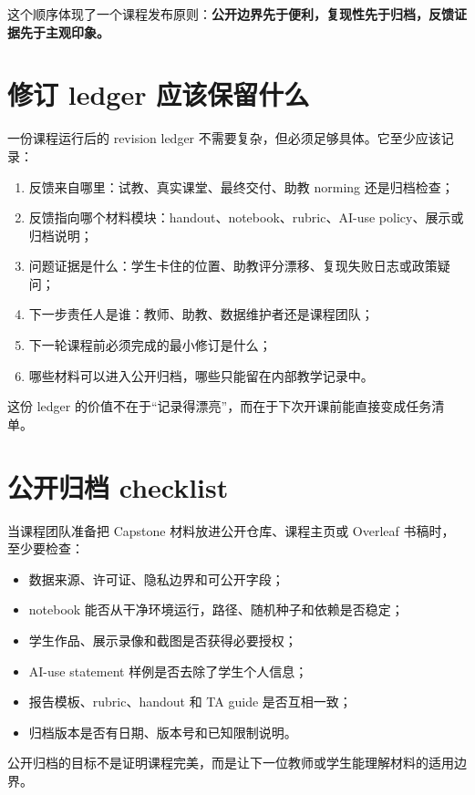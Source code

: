 这个顺序体现了一个课程发布原则：\textbf{公开边界先于便利，复现性先于归档，反馈证据先于主观印象。}

\section{修订 ledger 应该保留什么}

一份课程运行后的 revision ledger 不需要复杂，但必须足够具体。它至少应该记录：

\begin{enumerate}
    \item 反馈来自哪里：试教、真实课堂、最终交付、助教 norming 还是归档检查；
    \item 反馈指向哪个材料模块：handout、notebook、rubric、AI-use policy、展示或归档说明；
    \item 问题证据是什么：学生卡住的位置、助教评分漂移、复现失败日志或政策疑问；
    \item 下一步责任人是谁：教师、助教、数据维护者还是课程团队；
    \item 下一轮课程前必须完成的最小修订是什么；
    \item 哪些材料可以进入公开归档，哪些只能留在内部教学记录中。
\end{enumerate}

这份 ledger 的价值不在于“记录得漂亮”，而在于下次开课前能直接变成任务清单。

\section{公开归档 checklist}

当课程团队准备把 Capstone 材料放进公开仓库、课程主页或 Overleaf 书稿时，至少要检查：

\begin{itemize}
    \item 数据来源、许可证、隐私边界和可公开字段；
    \item notebook 能否从干净环境运行，路径、随机种子和依赖是否稳定；
    \item 学生作品、展示录像和截图是否获得必要授权；
    \item AI-use statement 样例是否去除了学生个人信息；
    \item 报告模板、rubric、handout 和 TA guide 是否互相一致；
    \item 归档版本是否有日期、版本号和已知限制说明。
\end{itemize}

公开归档的目标不是证明课程完美，而是让下一位教师或学生能理解材料的适用边界。

